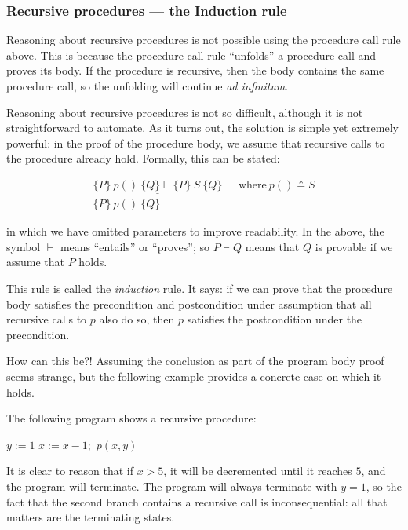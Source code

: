 \subsubsection*{Recursive procedures --- the Induction rule}

Reasoning about recursive procedures is not possible using the procedure call rule above. This is because the procedure call rule ``unfolds'' a procedure call and proves its body. If the procedure is recursive, then the body contains the same procedure call, so the unfolding will continue \emph{ad infinitum}.

Reasoning about recursive procedures is not so difficult, although it is not straightforward to automate. As it turns out, the solution is simple yet extremely powerful: in the proof of the procedure body, we assume that recursive calls to the procedure already hold. Formally, this can be stated:

\begin{displaymath}
 \begin{array}{cc}
\underline{\{P\}  ~p()~ \{Q\} \vdash \{P\}~S~\{Q\}} & ~~~\textrm{where}~ p() \sdef S\\
\{P\} ~p()~ \{Q\}
 \end{array}
\end{displaymath}

in which we have omitted parameters to improve readability. In the above, the symbol $\vdash$ means ``entails'' or ``proves''; so $P \vdash Q$ means that $Q$ is provable if we assume that $P$ holds.

This rule is called the \emph{induction} rule. It says: if we can prove that the procedure body satisfies the precondition and postcondition under assumption that all recursive calls to $p$ also do so, then $p$ satisfies the postcondition under the precondition.

How can this be?! Assuming the conclusion as part of the program body proof seems strange, but the following example provides a concrete case on which it holds.

\begin{example}

The following program shows a recursive procedure:

\begin{algorithmic}[0]
    \State $y := 1$
\Else
    \State $x := x - 1;$
    \State $p(x, y)$
\EndIf
\EndProcedure
\end{algorithmic}

It is clear to reason that if $x > 5$, it will be decremented until it reaches $5$, and the program will terminate. The program will always terminate with $y = 1$, so the fact that the second branch contains a recursive call is inconsequential: all that matters are the terminating states.

\end{example}


